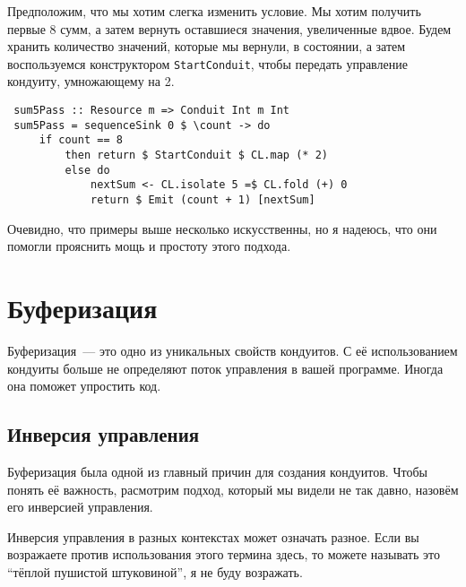 Предположим, что мы хотим слегка изменить условие. Мы хотим получить первые 8 сумм, а
затем вернуть оставшиеся значения, увеличенные вдвое. Будем хранить количество значений, которые
мы вернули, в состоянии, а затем воспользуемся конструктором
\lstinline'StartConduit', чтобы передать управление кондуиту, умножающему на 2.
\begin{lstlisting}
 sum5Pass :: Resource m => Conduit Int m Int
 sum5Pass = sequenceSink 0 $ \count -> do
     if count == 8
         then return $ StartConduit $ CL.map (* 2)
         else do
             nextSum <- CL.isolate 5 =$ CL.fold (+) 0
             return $ Emit (count + 1) [nextSum]
\end{lstlisting}
Очевидно, что примеры выше несколько искусственны, но я надеюсь, что они
помогли прояснить мощь и простоту этого подхода.

\section{Буферизация}

Буферизация~--- это одно из уникальных свойств кондуитов. С её использованием
кондуиты больше не определяют поток управления в вашей программе.
Иногда она поможет упростить код.

\subsection{Инверсия управления}

Буферизация была одной из главный причин для создания кондуитов. Чтобы понять её
важность, расмотрим подход, который мы видели не так давно, назовём его
инверсией управления.

\begin{remark}
Инверсия управления в разных контекстах может означать разное. Если вы возражаете
против использования этого термина здесь, то можете называть это
``тёплой пушистой штуковиной'', я не буду возражать.
\end{remark}

